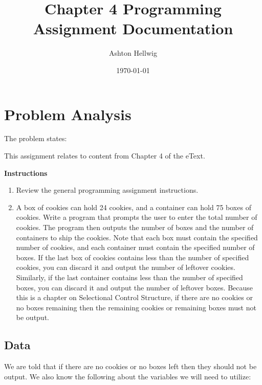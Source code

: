 \documentclass[a4paper, 11pt]{article}
\title{Chapter 4 Programming Assignment Documentation}
\author{Ashton Hellwig}
\date\today
\begin{document}
  \maketitle
  \tableofcontents
  \listofalgorithms
  \lstlistoflistings
  \listoffigures
  \newpage


  \section{Problem Analysis}
    The problem states:
    \begin{mdframed}[backgroundcolor=green!20]
      This assignment relates to content from Chapter 4 of the eText.

      \textbf{Instructions}\vspace{-8pt}
      \begin{enumerate}
        \item Review the general programming assignment instructions.
        \item%
          A box of cookies can hold 24 cookies, and a container can hold 75
            boxes of cookies. Write a program that prompts the user to enter the
            total number of cookies. The program then outputs the number of
            boxes and the number of containers to ship the cookies. Note that
            each box must contain the specified number of cookies, and each
            container must contain the specified number of boxes. If the last
            box of cookies contains less than the number of specified cookies,
            you can discard it and output the number of leftover cookies.
            Similarly, if the last container contains less than the number of
            specified boxes, you can discard it and output the number of
            leftover boxes. Because this is a chapter on Selectional Control
            Structure, if there are no cookies or no boxes remaining then the 
            remaining cookies or remaining boxes must not be output.
      \end{enumerate}
    \end{mdframed}

    \subsection{Data}
      We are told that if there are no cookies or no boxes left then they should
        not be output. We also know the following about the variables we will
        need to utilize:
\end{document}
